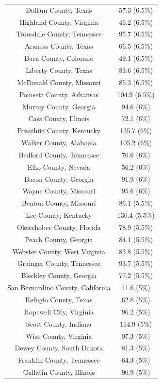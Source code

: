 \begin{table}[ht]
\begin{tabular}{cc}
  Dallam County, Texas & 57.3 (6.5\%) \\ 
  Highland County, Virginia & 46.2 (6.5\%) \\ 
  Trousdale County, Tennessee & 95.7 (6.5\%) \\ 
  Aransas County, Texas & 66.5 (6.5\%) \\ 
  Baca County, Colorado & 49.1 (6.5\%) \\ 
  Liberty County, Texas & 83.6 (6.5\%) \\ 
  McDonald County, Missouri & 85.3 (6.5\%) \\ 
  Poinsett County, Arkansas & 104.9 (6.5\%) \\ 
  Murray County, Georgia & 94.6 (6\%) \\ 
  Cass County, Illinois & 72.1 (6\%) \\ 
  Breathitt County, Kentucky & 135.7 (6\%) \\ 
  Walker County, Alabama & 105.2 (6\%) \\ 
  Bedford County, Tennessee & 70.6 (6\%) \\ 
  Elko County, Nevada & 56.2 (6\%) \\ 
  Bacon County, Georgia & 91.9 (6\%) \\ 
  Wayne County, Missouri & 95.6 (6\%) \\ 
  Benton County, Missouri & 86.1 (5.5\%) \\ 
  Lee County, Kentucky & 130.4 (5.5\%) \\ 
  Okeechobee County, Florida & 78.9 (5.5\%) \\ 
  Peach County, Georgia & 84.1 (5.5\%) \\ 
  Webster County, West Virginia & 83.8 (5.5\%) \\ 
  Grainger County, Tennessee & 93.7 (5.5\%) \\ 
  Bleckley County, Georgia & 77.2 (5.5\%) \\ 
  San Bernardino County, California & 41.6 (5\%) \\ 
  Refugio County, Texas & 62.8 (5\%) \\ 
  Hopewell City, Virginia & 96.2 (5\%) \\ 
  Scott County, Indiana & 114.9 (5\%) \\ 
  Wise County, Virginia & 97.3 (5\%) \\ 
  Dewey County, South Dakota & 81.3 (5\%) \\ 
  Franklin County, Tennessee & 64.3 (5\%) \\ 
  Gallatin County, Illinois & 90.9 (5\%) \\ 

\end{tabular}
\end{table}

